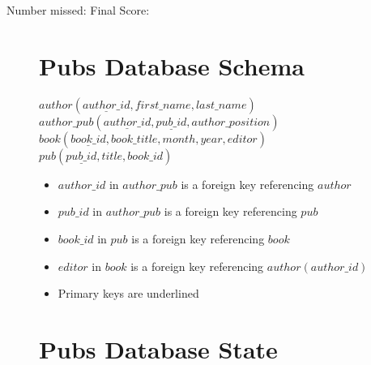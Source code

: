 \documentclass[answers,10pt,a4paper]{exam}
\begin{document}
\fi

\vspace{.5in}

Number missed: \makebox[.5in]{\hrulefill} Final Score: \makebox[.5in]{\hrulefill}

\newpage


\pointsinmargin
\bracketedpoints

\marginpointname{}

\begin{figure}[H]

\section*{Pubs Database Schema}

$author(\underline{author\_id}, first\_name, last\_name)$\\

$author\_pub(\underline{author\_id}, \underline{pub\_id}, author\_position)$\\

$book(\underline{book\_id}, book\_title, month, year, editor)$\\

$pub(\underline{pub\_id}, title, book\_id)$

\begin{itemize}
\item $author\_id$ in $author\_pub$ is a foreign key referencing $author$
\item $pub\_id$ in $author\_pub$ is a foreign key referencing $pub$
\item $book\_id$ in $pub$ is a foreign key referencing $book$
\item $editor$ in $book$ is a foreign key referencing $author(author\_id)$
\item Primary keys are underlined
\end{itemize}

\section*{Pubs Database State}

\begin{multicols}{2}


\end{multicols}
\end{figure}
\end{document}
